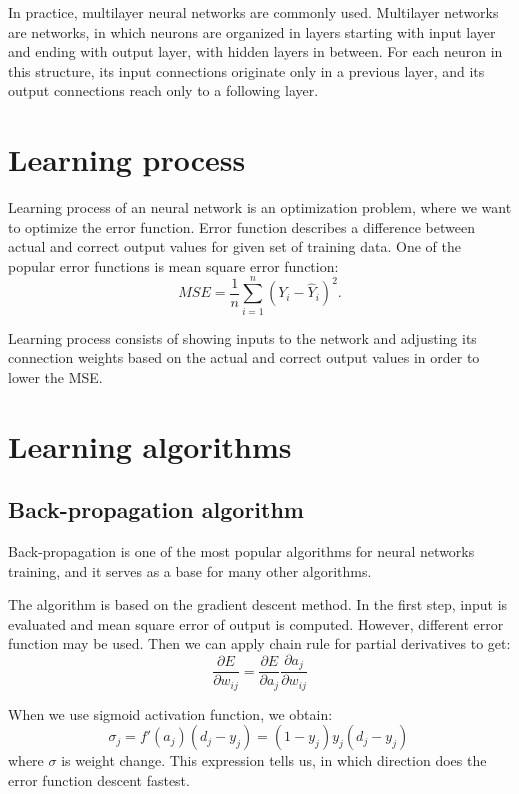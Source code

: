 In practice, multilayer neural networks are commonly used. Multilayer networks are networks, in which neurons are organized in layers starting with input layer and ending with output layer, with hidden layers in between. For each neuron in this structure, its input connections originate only in a previous layer, and its output connections reach only to a following layer. 

\section{Learning process}
Learning process of an neural network is an optimization problem, where we want to optimize the error function. Error function describes a difference between actual and correct output values for given set of training data. One of the popular error functions is mean square error function:
\begin{equation*}
MSE  =  \frac{1}{n} \sum_{i=1}^{n} (Y_{i} - \hat{Y}_{i})^2.
\end{equation*}

Learning process consists of showing inputs to the network and adjusting its connection weights based on the actual and correct output values in order to lower the MSE.

\section{Learning algorithms}

\subsection{Back-propagation algorithm}
Back-propagation is one of the most popular algorithms for neural networks training, and it serves as a base for many other algorithms.

The algorithm is based on the gradient descent method. In the first step, input is evaluated and mean square error of output is computed. However, different error function may be used. Then we can apply chain rule for partial derivatives to get:
\begin{equation*}
\frac{\partial E}{\partial w_{ij}} = \frac{\partial E}{\partial a_{j}} \frac{\partial a_{j}}{\partial w_{ij}}
\end{equation*}

When we use sigmoid activation function, we obtain:
\begin{equation*}
\sigma_{j}  =  f'(a_{j})(d_{j} - y_{j}) = (1-y_{j})y_{j}(d_{j}-y_{j})\,
\end{equation*}
where $\sigma$ is weight change. This expression tells us, in which direction does the error function descent fastest.

